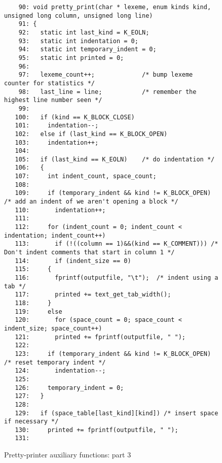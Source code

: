 \begin{figure}
\hspace*{-2.5cm}
\begin{minipage}{30cm}
\footnotesize
\begin{verbatim}
    90: void pretty_print(char * lexeme, enum kinds kind, unsigned long column, unsigned long line)
    91: {
    92:   static int last_kind = K_EOLN; 
    93:   static int indentation = 0; 
    94:   static int temporary_indent = 0; 
    95:   static int printed = 0; 
    96:   
    97:   lexeme_count++;             /* bump lexeme counter for statistics */
    98:   last_line = line;           /* remember the highest line number seen */
    99:   
   100:   if (kind == K_BLOCK_CLOSE)
   101:     indentation--; 
   102:   else if (last_kind == K_BLOCK_OPEN)
   103:     indentation++; 
   104:   
   105:   if (last_kind == K_EOLN)    /* do indentation */
   106:   {
   107:     int indent_count, space_count; 
   108:     
   109:     if (temporary_indent && kind != K_BLOCK_OPEN) /* add an indent of we aren't opening a block */
   110:       indentation++; 
   111:     
   112:     for (indent_count = 0; indent_count < indentation; indent_count++)
   113:       if (!((column == 1)&&(kind == K_COMMENT))) /* Don't indent comments that start in column 1 */
   114:       if (indent_size == 0)
   115:     {
   116:       fprintf(outputfile, "\t");  /* indent using a tab */
   117:       printed += text_get_tab_width(); 
   118:     }
   119:     else
   120:       for (space_count = 0; space_count < indent_size; space_count++)
   121:       printed += fprintf(outputfile, " "); 
   122:     
   123:     if (temporary_indent && kind != K_BLOCK_OPEN) /* reset temporary indent */
   124:       indentation--; 
   125:     
   126:     temporary_indent = 0; 
   127:   }
   128:   
   129:   if (space_table[last_kind][kind]) /* insert space if necessary */
   130:     printed += fprintf(outputfile, " "); 
   131:   
\end{verbatim}
\end{minipage}
\caption{Pretty-printer auxiliary functions: part 3}
\label{pr_c_aux.c:3}
\end{figure}

